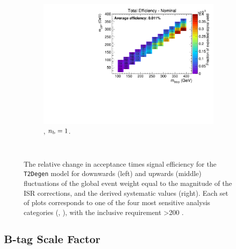 \begin{figure}[ht!]
\begin{subfigure}[b]{0.32\textwidth}
    \includegraphics[width=\textwidth, page=6]{Figs/sms/t2degen/v5/ISR_T2_4body_v5_eq1b_ge4j_incl.pdf}
    \caption{\njhigh, $n_{\text{b}} = 1$.}
  \end{subfigure}\\
  \caption{The relative change in acceptance times signal efficiency for the
  \texttt{T2Degen} model for downwards (left) and upwards (middle) fluctuations
  of the global event weight equal to the magnitude of the ISR corrections,
  and the derived systematic values (right). Each set of plots corresponds
  to one of the four most sensitive analysis categories (\nb, \nj), with the
  inclusive requirement \HT>200 \gev.}
  \label{fig:sms-isr-t2degen}
\end{figure}


\newpage
\subsection*{B-tag Scale Factor}
\label{sec:t2degen_btag_plots}

